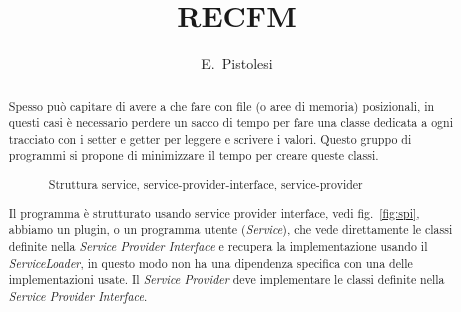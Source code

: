 \documentclass[a4paper,10pt]{report}
\title{RECFM}
\author{E.~Pistolesi}
\begin{document}
\maketitle

\begin{abstract}
Spesso può capitare di avere a che fare con file (o aree di memoria)
posizionali, in questi casi è necessario perdere un sacco di tempo per fare una
classe dedicata a ogni tracciato con i setter e getter per leggere e scrivere
i valori. 
Questo gruppo di programmi si propone di minimizzare il tempo per creare queste
classi.

\begin{figure}[!htb]
\centering
{}
\caption{Struttura service, service-provider-interface, service-provider} 
\label{fig:spi}
\end{figure}

Il programma è strutturato usando service provider interface, 
vedi fig.~\ref{fig:spi}, abbiamo un plugin, o un programma utente 
(\textsl{Service}), che vede direttamente le classi definite nella 
\textsl{Service Provider Interface} e recupera la implementazione usando il 
\textsl{ServiceLoader}, in questo modo non ha una dipendenza specifica con una
delle implementazioni usate. 
Il \textsl{Service Provider} deve implementare le classi definite nella 
\textsl{Service Provider Interface}.


\end{abstract}
\end{document}
